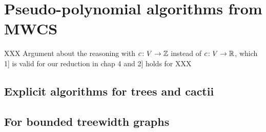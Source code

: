 	\section{Pseudo-polynomial algorithms from MWCS}

		XXX Argument about the reasoning with $c\colon V \to \mathbb{Z}$ instead of $c\colon V \to \mathbb{R}$, which 1] is valid for our reduction in chap 4 and 2] holds for \bcmwcs{} XXX

		\subsection{Explicit algorithms for trees and cactii}

		\subsection{For bounded treewidth graphs}
